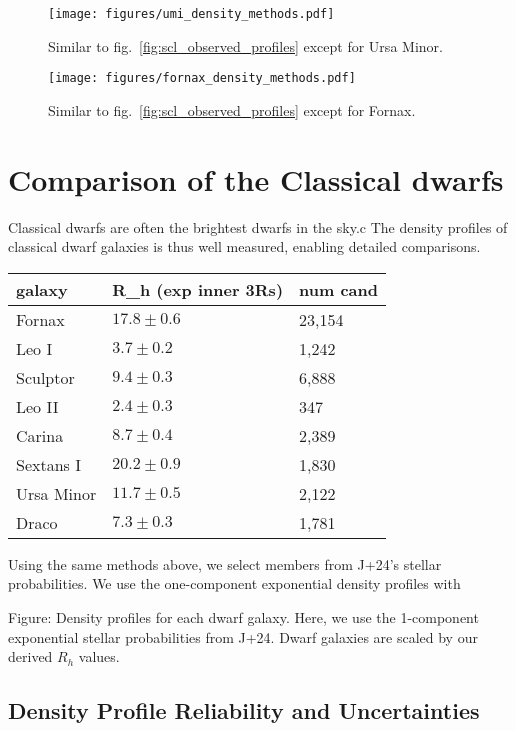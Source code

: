 \begin{figure}
\centering
\texttt{[image: figures/umi\_density\_methods.pdf]}
\caption[Ursa Minor density profiles]{Similar to
fig.~\ref{fig:scl_observed_profiles} except for Ursa
Minor.}\label{fig:umi_observed_profiles}
\end{figure}

\begin{figure}
\centering
\texttt{[image: figures/fornax\_density\_methods.pdf]}
\caption[Fornax density profiles]{Similar to
fig.~\ref{fig:scl_observed_profiles} except for
Fornax.}\label{fig:fornax_observed_profiles}
\end{figure}

\section{Comparison of the Classical
dwarfs}\label{comparison-of-the-classical-dwarfs}

Classical dwarfs are often the brightest dwarfs in the sky.c The density
profiles of classical dwarf galaxies is thus well measured, enabling
detailed comparisons.

\begin{table*}[t]
\centering
\begin{tabular}{lll}
\toprule
galaxy & R\_h (exp inner 3Rs) & num cand\\
\midrule
Fornax & $17.8\pm0.6$ & 23,154\\
Leo I & $3.7\pm0.2$ & 1,242\\
Sculptor & $9.4\pm0.3$ & 6,888\\
Leo II & $2.4\pm0.3$ & 347\\
Carina & $8.7\pm0.4$ & 2,389\\
Sextans I & $20.2 \pm0.9$ & 1,830\\
Ursa Minor & $11.7 \pm 0.5$ & 2,122\\
Draco & $7.3\pm0.3$ & 1,781\\
\bottomrule
\end{tabular}
\end{table*}

Using the same methods above, we select members from J+24's stellar
probabilities. We use the one-component exponential density profiles
with

Figure: Density profiles for each dwarf galaxy. Here, we use the
1-component exponential stellar probabilities from J+24. Dwarf galaxies
are scaled by our derived \(R_h\) values.

\subsection{Density Profile Reliability and
Uncertainties}\label{density-profile-reliability-and-uncertainties}

